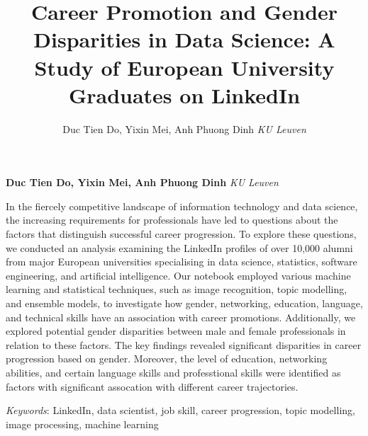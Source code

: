 \documentclass[11pt,]{article}
\title{Career Promotion and Gender Disparities in Data Science: A Study
of European University Graduates on LinkedIn  }
\author{\Large Duc Tien Do, Yixin Mei, Anh Phuong
Dinh\vspace{0.05in} \newline\normalsize\emph{KU Leuven}  }
\date{}
\newcommand*{\authorfont}{\fontfamily{phv}\selectfont}
\renewenvironment{abstract}
 {{%
    \setlength{\leftmargin}{0mm}
    \setlength{\rightmargin}{\leftmargin}%
  }%
  \relax}
 {\endlist}
\begin{document}
%

{%
\setlength{\parindent}{0pt}
\thispagestyle{plain}
{\fontsize{18}{20}\selectfont\raggedright
\maketitle  %

}

{
   \vskip 13.5pt\relax \normalsize\fontsize{11}{12}
\textbf{\authorfont Duc Tien Do, Yixin Mei, Anh Phuong
Dinh} \hskip 15pt \emph{\small KU Leuven}   

}

}








\begin{abstract}

    \hbox{\vrule height .2pt width 39.14pc}

    \vskip 8.5pt %

\noindent In the fiercely competitive landscape of information
technology and data science, the increasing requirements for
professionals have led to questions about the factors that distinguish
successful career progression. To explore these questions, we conducted
an analysis examining the LinkedIn profiles of over 10,000 alumni from
major European universities specialising in data science, statistics,
software engineering, and artificial intelligence. Our notebook employed
various machine learning and statistical techniques, such as image
recognition, topic modelling, and ensemble models, to investigate how
gender, networking, education, language, and technical skills have an
association with career promotions. Additionally, we explored potential
gender disparities between male and female professionals in relation to
these factors. The key findings revealed significant disparities in
career progression based on gender. Moreover, the level of education,
networking abilities, and certain language skills and professtional
skills were identified as factors with significant assocation with
different career trajectories.


\vskip 8.5pt \noindent \emph{Keywords}: LinkedIn, data scientist, job
skill, career progression, topic modelling, image processing, machine
learning \par

    \hbox{\vrule height .2pt width 39.14pc}



\end{abstract}
\end{document}
